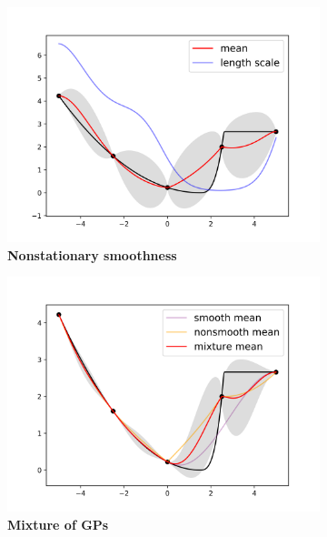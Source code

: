 \documentclass{article}
\numberwithin{equation}{section}
\begin{document}
\begin{figure}
		\centering
		\captionsetup{justification=centering}
    \begin{subfigure}[b]{.4\textwidth}
      \centering
      \includegraphics[scale=0.35]{figures/kink-smoothness.png}
      \caption{\textbf{Nonstationary smoothness}}
    \end{subfigure}%
    \begin{subfigure}[b]{.4\textwidth}
      \centering
      \includegraphics[scale=0.35]{figures/kink-mixture.png}
      \caption{\textbf{Mixture of GPs}}
    \end{subfigure}
    \begin{subfigure}[b]{.4\textwidth}
      \centering

\end{subfigure}
\end{figure}
\end{document}
